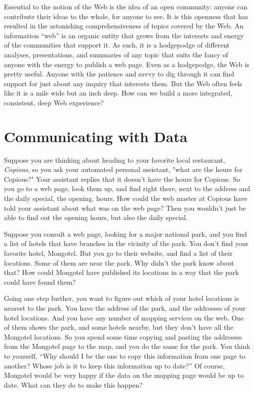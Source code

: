 Essential to the notion of the Web is the idea of an open community: anyone can contribute their ideas to the whole, 
for anyone to see. It is this openness that has resulted in the astonishing comprehensiveness of topics covered by the 
Web. An information ``web'' is an organic entity that grows from the interests and energy of the communities that 
support it. As such, it is a hodgepodge of different analyses, presentations, and summaries of any topic that 
suits the fancy of anyone with the energy to publish a web page. Even as a hodgepodge, the Web is pretty useful. 
Anyone with the patience and savvy to dig through it can find support for just about any inquiry that interests 
them. But the Web often feels like it is a mile wide but an inch deep. How can we build a more integrated, 
consistent, deep Web experience?


\section{Communicating with Data}
\label{webdata}
Suppose you are thinking about heading to your favorite local restaurant, 
\emph{Copious}, so you ask your automated personal assistant, "what are the hours for
Copious?"  Your assistant replies that it doesn't have the hours for Copious.  
So you go to a web page, look them up, and find right there, next to the 
address and the daily special, the opening. hours.  How could the web master
at Copious have told your assistant about what was on the web page?   Then you
wouldn't just be able to find out the opening hours, but also the daily special. 

 
Suppose you consult a web page, looking for a major national park, and
you find a list of hotels that have branches in the vicinity of the
park. You don't find your favorite hotel, Mongotel.  But you go to their 
website, and find a list of their locations.  Some of them are near the park. 
Why didn't the park know about that?   How could Mongotel have published its
locations in a way that the park could have found them? 

Going one step further, you want to figure out which of your hotel locations is 
nearest to the park.  You have the address of the park, and the addresses of 
your hotel locations.  And you have any number of mapping services on the web. 
One of them shows the park, and some hotels nearby, but they don't have all the Mongotel locations. 
So you spend some
time copying and pasting the addresses from the Mongotel page to the map, and you 
do the same for the park.  You think to yourself, ``Why should I be the one
to copy this information from one page to another? Whose job is it to keep this
information up to date?''  Of course, Mongotel would be very happy if the data on 
the mapping page would be up to date.  What can they do to make this happen? 


